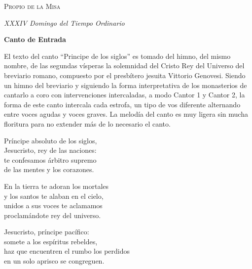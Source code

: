 \documentclass[12pt, letterpaper]{report}
\begin{document}
    
    \begin{center}
        \vspace*{8cm}
        { \scshape \Huge Propio de la Misa \par}
        \vspace{1cm}
        { \itshape \Large XXXIV Domingo del Tiempo Ordinario \par}
    \end{center}
    \clearpage

    \begin{center}
        \Huge {\bfseries Canto de Entrada}
    \end{center}

    \Large El texto del canto ``Principe de los siglos'' es tomado del himno, del mismo nombre, de las segundas v\'isperas la solemnidad del Cristo Rey del Universo del breviario romano, compuesto por el presb\'itero jesuita Vittorio Genovesi. Siendo un himno del breviario y siguiendo la forma interpretativa de los monasterios de cantarlo a coro con intervenciones intercaladas, a modo Cantor 1 y Cantor 2, la forma de este canto intercala cada estrofa, un tipo de vos diferente alternando entre voces agudas y voces graves. La melod\'ia del canto es muy ligera sin mucha floritura para no extender m\'as de lo necesario el canto.

    \noindent
    \LARGE Pr\'incipe absoluto de los siglos,\\
    Jesucristo, rey de las naciones:\\
    te confesamos \'arbitro supremo\\
    de las mentes y los corazones.

    \noindent
    En la tierra te adoran los mortales\\
    y los santos te alaban en el cielo,\\
    unidos a sus voces te aclamamos\\
    proclam\'andote rey del universo.

    \noindent
    Jesucristo, pr\'incipe pac\'ifico:\\
    somete a los esp\'iritus rebeldes,\\
    haz que encuentren el rumbo los perdidos\\
    en un solo aprisco se congreguen.
\end{document}

